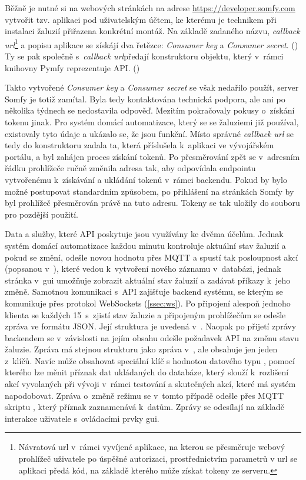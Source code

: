     Běžně je nutné si na webových stránkách na adrese \href{https://develeoper.somfy.com}{https://developer.som\-fy.com} vytvořit tzv. aplikaci pod uživatelským účtem, ke kterému je technikem při instalaci žaluzií přiřazena konkrétní montáž. Na základě zadaného názvu, \emph{callback \acrshort{url}}\footnote[1]{Návratová \acrshort{url} v~rámci vyvíjené aplikace, na kterou se přesměruje webový prohlížeč uživatele po úspěšné autorizaci, prostřednictvím parametrů v \acrshort{url} se aplikaci předá kód, na základě kterého může získat tokeny ze serveru.} a popisu aplikace se získájí dva řetězce: \emph{Consumer key} a \emph{Consumer secret}. (\cite{somfy:api}) Ty se pak společně s~\emph{callback \acrshort{url}}\footnotemark[1] předají konstruktoru objektu, který v~rámci knihovny Pymfy reprezentuje API. (\cite{tetienne:pymfy})

    Takto vytvořené \emph{Consumer key} a \emph{Consumer secret} se však nedařilo použít, server Somfy je totiž zamítal. Byla tedy kontaktována technická podpora, ale ani po několika týdnech se nedostavila odpověď. Mezitím pokračovaly pokusy o~získání tokenu jinak. Pro systém domácí automatizace, který se se žaluziemi již používal, existovaly tyto údaje a ukázalo se, že jsou funkční. Místo správné \emph{callback \acrshort{url}} se tedy do konstruktoru zadala ta, která příslušela k~aplikaci ve vývojářském portálu, a byl zahájen proces získání tokenů. Po přesměrování zpět se v~adresním řádku prohlížeče ručně změnila adresa tak, aby odpovídala endpointu vytvořenému k~získávání a ukládání tokenů v~rámci backendu. Pokud by bylo možné postupovat standardním způsobem, po přihlášení na stránkách Somfy by byl prohlížeč přesměrován právě na tuto adresu. Tokeny se tak uložily do souboru  pro pozdější použití.

    Data a služby, které API poskytuje jsou využívány ke dvěma účelům. Jednak systém domácí automatizace každou minutu kontroluje aktuální stav žaluzií a pokud se změní, odešle novou hodnotu přes MQTT a spustí tak posloupnost akcí (popsanou v~), které vedou k~vytvoření nového záznamu v~databázi, jednak stránka  v~\acrshort{gui} umožňuje zobrazit aktuální stav žaluzií a zadávat příkazy k~jeho změně. Samotnou komunikaci s~API zajišťuje backend systému, se kterým se komunikuje přes protokol WebSockets (\cref{ssec:ws}). Po připojení alespoň jednoho klienta se každých 15~s~zjistí stav žaluzie a připojeným prohlížečům se odešle zpráva ve formátu JSON. Její struktura je uvedená v~. Naopak po přijetí zprávy backendem se v~závislosti na jejím obsahu odešle požadavek API na změnu stavu žaluzie. Zpráva má stejnou strukturu jako zpráva v~, ale obsahuje jen jeden z~klíčů. Navíc může obsahovat speciální klíč  s hodnotou datového typu , pomocí kterého lze měnit příznak  dat ukládaných do databáze, který slouží k~rozlišení akcí vyvolaných při vývoji v~rámci testování a skutečných akcí, které má systém napodobovat. Zpráva o~změně režimu se v~tomto případě odešle přes MQTT skriptu , který příznak zaznamenává k~datům. Zprávy se odesílají na základě interakce uživatele s~ovládacími prvky \acrshort{gui}.

